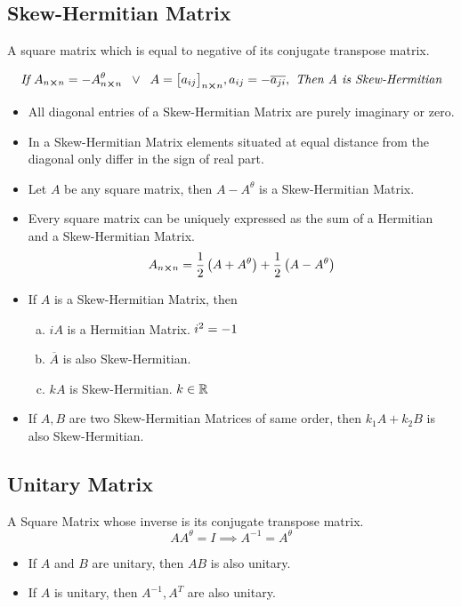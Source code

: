 \documentclass{article}
\begin{document}
\subsection{Skew-Hermitian Matrix}
A square matrix which is equal to negative of its conjugate transpose matrix.

$$\textit{ If } A_{n \cross n}=-A_{n \cross n}^\theta \hspace{2mm} \vee \hspace{2mm} A={\begin{bmatrix}
        a_{ij}
    \end{bmatrix}}_{n \cross n}, a_{ij}=-\overline{a_{ji}}, \textit{ Then A is Skew-Hermitian } $$
\begin{itemize}
    \item All diagonal entries of a Skew-Hermitian Matrix are purely imaginary or zero.
    \item In a Skew-Hermitian Matrix elements situated at equal distance from the diagonal only differ in the sign of real part.
    \item Let $A$ be any square matrix, then $A-A^\theta$ is a Skew-Hermitian Matrix.
    \item Every square matrix can be uniquely expressed as the sum of a Hermitian and a Skew-Hermitian Matrix.
          $$A_{n \cross n}=\dfrac{1}{2}\left(A+A^\theta\right)+\dfrac{1}{2}\left(A-A^\theta\right) $$
    \item If $A$ is a Skew-Hermitian Matrix, then
          \begin{enumerate}[a.]
              \item $iA$ is a Hermitian Matrix. $\hfill i^2=-1$
              \item $\overline{A}$ is also Skew-Hermitian.
              \item $kA$ is Skew-Hermitian. $\hfill k \in \mathbb{R}$
          \end{enumerate}
    \item If $A, B$ are two Skew-Hermitian Matrices of same order, then $k_{1}A +k_{2}B $ is also Skew-Hermitian.
\end{itemize}

\subsection{Unitary Matrix}
A Square Matrix whose inverse is its conjugate transpose matrix.
$$AA^\theta=I \implies A^{-1}=A^\theta $$
\begin{itemize}
    \item If $A $ and $B $ are unitary, then $AB$ is also unitary.
    \item If $A$ is unitary, then $A^{-1}, A^T $ are also unitary.
\end{itemize}
\end{document}
